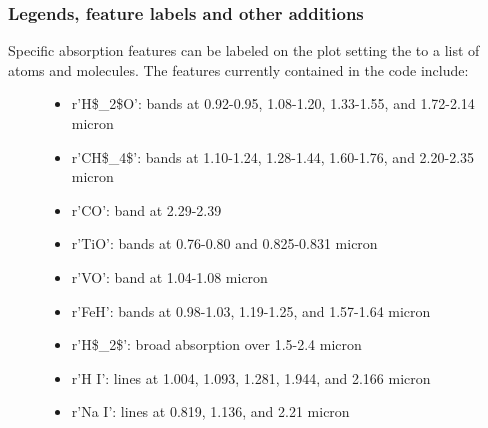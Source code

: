 \documentclass[letterpaper,10pt,english]{sphinxmanual}
\begin{document}
\subsubsection{Legends, feature labels and other additions}
\label{splat_plot:legends-feature-labels-and-other-additions}\begin{description}
\item[{Specific absorption features can be labeled on the plot setting the  to a list of atoms and molecules. The features currently contained in the code include:}] \leavevmode\begin{itemize}
\item {} 
r'H\$\_2\$O': bands at 0.92-0.95, 1.08-1.20, 1.33-1.55, and 1.72-2.14 micron

\item {} 
r'CH\$\_4\$': bands at 1.10-1.24, 1.28-1.44, 1.60-1.76, and 2.20-2.35 micron

\item {} 
r'CO': band at 2.29-2.39

\item {} 
r'TiO': bands at 0.76-0.80 and 0.825-0.831 micron

\item {} 
r'VO': band at 1.04-1.08 micron

\item {} 
r'FeH': bands at 0.98-1.03, 1.19-1.25, and 1.57-1.64 micron

\item {} 
r'H\$\_2\$': broad absorption over 1.5-2.4 micron

\item {} 
r'H I': lines at 1.004, 1.093, 1.281, 1.944, and 2.166 micron

\item {} 
r'Na I': lines at 0.819, 1.136, and 2.21 micron

\end{itemize}


\end{description}
\end{document}

